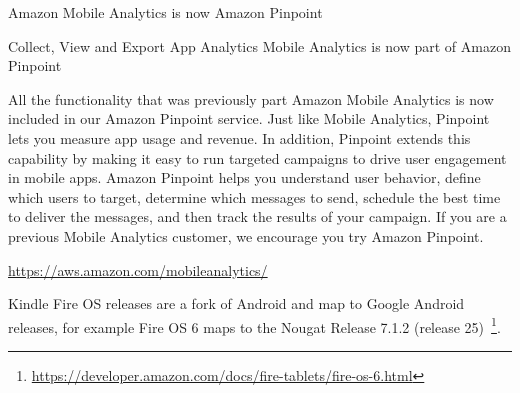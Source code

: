 Amazon Mobile Analytics is now Amazon Pinpoint

Collect, View and Export App Analytics
Mobile Analytics is now part of Amazon Pinpoint

All the functionality that was previously part Amazon Mobile Analytics is now included in our Amazon Pinpoint service. Just like Mobile Analytics, Pinpoint lets you measure app usage and revenue. In addition, Pinpoint extends this capability by making it easy to run targeted campaigns to drive user engagement in mobile apps. Amazon Pinpoint helps you understand user behavior, define which users to target, determine which messages to send, schedule the best time to deliver the messages, and then track the results of your campaign. If you are a previous Mobile Analytics customer, we encourage you try Amazon Pinpoint.

\url{https://aws.amazon.com/mobileanalytics/}

Kindle Fire OS releases are a fork of Android and map to Google Android releases, for example Fire OS 6 maps to the Nougat Release 7.1.2 (release 25)~\footnote{\url{https://developer.amazon.com/docs/fire-tablets/fire-os-6.html}}.